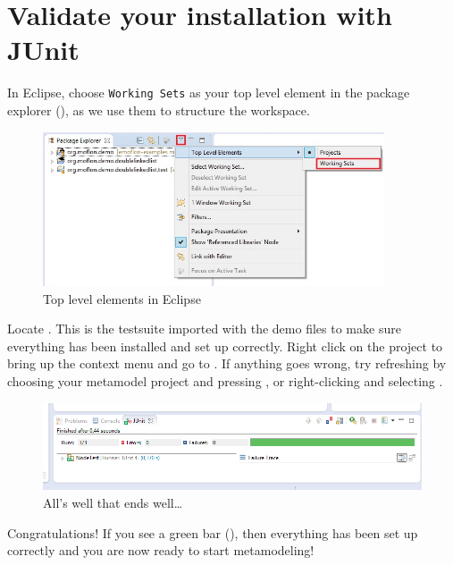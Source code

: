 \clearpage
\genHeader
\hypertarget{validate common}{} 
\section{Validate your installation with JUnit}

\begin{stepbystep}

\item  In Eclipse, choose \texttt{Working Sets} as your top level element in the package explorer (), as we use them to structure the workspace.

\begin{figure}[htbp]
	\centering
  \includegraphics[width=0.9\textwidth]{../../org.moflon.doc.handbook.01_installation/3_validate/va_images/eclipse_explorerWorkingsets}
	\caption{Top level elements in Eclipse}
	\label{eclipse:topLevel}
\end{figure}

\item 
Locate .
This is the testsuite imported with the demo files to make sure everything has been installed and set up correctly.
Right click on the project to bring up the context menu and go to .
If anything goes wrong, try refreshing by choosing your metamodel project and pressing , or right-clicking and selecting .

\begin{figure}[htbp]
	\centering
  \includegraphics[width=1\textwidth]{../../org.moflon.doc.handbook.01_installation/3_validate/va_images/eclipse_passedJUnitTest}
	\caption{All's well that ends well\ldots}
	\label{eclipse:passedTest}
\end{figure}

\vspace{0.5cm}

Congratulations!
If you see a green bar (), then everything has been set up correctly and you are now ready to start metamodeling!

\end{stepbystep}